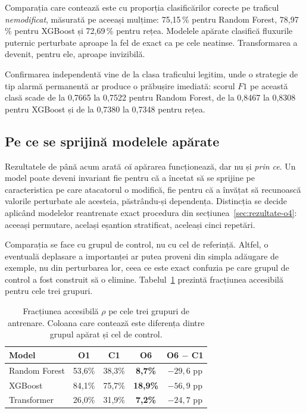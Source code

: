 Comparația care contează este cu proporția clasificărilor corecte pe traficul \emph{nemodificat}, măsurată pe aceeași mulțime: 75,15\,\% pentru Random Forest, 78,97\,\% pentru XGBoost și 72,69\,\% pentru rețea. Modelele apărate clasifică fluxurile puternic perturbate aproape la fel de exact ca pe cele neatinse. Transformarea a devenit, pentru ele, aproape invizibilă.

Confirmarea independentă vine de la clasa traficului legitim, unde o strategie de tip alarmă permanentă ar produce o prăbușire imediată: scorul $F1$ pe această clasă scade de la 0,7665 la 0,7522 pentru Random Forest, de la 0,8467 la 0,8308 pentru XGBoost și de la 0,7380 la 0,7348 pentru rețea.

\subsection{Pe ce se sprijină modelele apărate}\label{subsec:o6-mecanism}

Rezultatele de până acum arată \emph{că} apărarea funcționează, dar nu și \emph{prin ce}. Un model poate deveni invariant fie pentru că a încetat să se sprijine pe caracteristica pe care atacatorul o modifică, fie pentru că a învățat să recunoască valorile perturbate ale acesteia, păstrându-și dependența. Distincția se decide aplicând modelelor reantrenate exact procedura din secțiunea~\ref{sec:rezultate-o4}: aceeași permutare, același eșantion stratificat, aceleași cinci repetări.

Comparația se face cu grupul de control, nu cu cel de referință. Altfel, o eventuală deplasare a importanței ar putea proveni din simpla adăugare de exemple, nu din perturbarea lor, ceea ce este exact confuzia pe care grupul de control a fost construit să o elimine. Tabelul~\ref{tab:o6-rho} prezintă fracțiunea accesibilă pentru cele trei grupuri.

\begin{table}[!ht]
    \caption{Fracțiunea accesibilă $\rho$ pe cele trei grupuri de antrenare. Coloana care contează este diferența dintre grupul apărat și cel de control.}
    \centering
    \begin{tabular}{|l|c|c|c|c|}
        \hline
        \textbf{Model} & \textbf{O1} & \textbf{C1} & \textbf{O6} & \textbf{O6 $-$ C1} \\
        \hline
        Random Forest & 53,6\% & 38,3\% & \textbf{8,7\%} & $-29{,}6$ pp \\
        \hline
        XGBoost & 84,1\% & 75,7\% & \textbf{18,9\%} & $-56{,}9$ pp \\
        \hline
        Transformer & 26,0\% & 31,9\% & \textbf{7,2\%} & $-24{,}7$ pp \\
        \hline
    \end{tabular}
    \label{tab:o6-rho}
\end{table}


